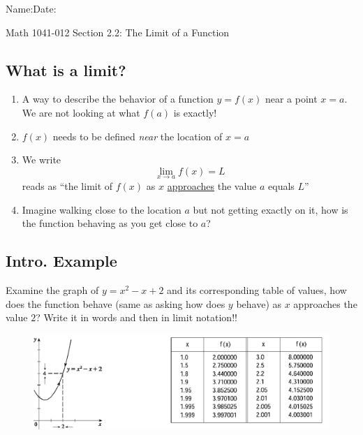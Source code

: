 \documentclass[10pt]{book}
\theoremstyle{definition}
\begin{document}
\begin{flushleft}
Name:\underline{\hspace{13cm}}Date:\underline{\hspace{2cm}}
\end{flushleft}
\begin{center}
{\Large Math 1041-012 \hspace{0.5cm} Section 2.2: The Limit of a Function}
\end{center}

\begin{tcolorbox}
\subsection*{What is a limit?}
\begin{enumerate}
    \item A way to describe the behavior of a function $y=f(x)$ near a point $x=a$. We are not looking at what $f(a)$ is exactly!
    \item $f(x)$ needs to be defined \textit{near} the location of $x=a$
    \item We write
    \[
    \lim_{x\rightarrow a}f(x)= L
    \]
    reads as ``the limit of $f(x)$ as $x$ \underline{approaches} the value $a$ equals $L$''
    \item Imagine walking close to the location $a$ but not getting exactly on it, how is the function behaving as you get close to $a$?
\end{enumerate}
\end{tcolorbox}
\subsection*{Intro. Example}
Examine the graph of $y=x^2-x+2$ and its corresponding table of values, how does the function behave (same as asking how does $y$ behave) as $x$ approaches the value $2$? Write it in words and then in limit notation!!
\begin{figure}[h!]
\centering
    \includegraphics[scale=0.65]{fig1.png}
\end{figure}
\\ \\
\end{document}
